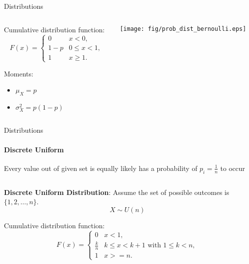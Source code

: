 {\begin{frame}{Distributions}
\begin{columns}[onlytextwidth]
\begin{column}{0.5\textwidth}
\begin{boxed}
                    Cumulative distribution function:
                    $$F(x) = \begin{cases} 0 & x < 0, \\ 1-p & 0 \le x < 1, \\ 1 & x \geq 1 . \end{cases}$$

                    Moments:
                    \begin{itemize}
                        \item  $\mu_X = p$
                        \item $\sigma_X^2 = p(1-p)$
                    \end{itemize}
                \end{boxed}
            \end{column}
            \begin{column}{0.5\textwidth}
                \begin{center}
                    \texttt{[image: fig/prob\_dist\_bernoulli.eps]}
                \end{center}
            \end{column}
        \end{columns}
    \end{frame}

    \begin{frame}{Distributions}
        \framesubtitle{Discrete Uniform}
        Every value out of given set is equally likely has a probability of $p_i = \frac{1}{n}$ to occur

        \vspace*{3mm}
        \begin{columns}[onlytextwidth]
            \begin{column}{0.5\textwidth}
                \begin{boxed}
                    \textbf{Discrete Uniform Distribution}:
                    Assume the set of possible outcomes is $\{1, 2, \ldots, n\}$.
                    $$X \sim U(n)$$

                    Cumulative distribution function:
                    $$F(x) = \begin{cases} 0 & x < 1, \\ \frac{k}{n} & k \le x < k+1 \text{ with } 1 \le k < n, \\ 1 & x >= n . \end{cases}$$


\end{boxed}
\end{column}
\end{columns}
\end{frame}}
